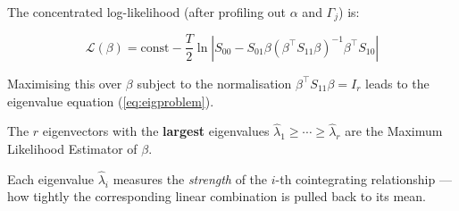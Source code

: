\documentclass[12pt, a4paper]{article}
\begin{document}
The concentrated log-likelihood (after profiling out $\alpha$ and $\Gamma_j$) is:

\begin{equation}
    \mathcal{L}(\beta) = \text{const} - \frac{T}{2} \ln\left| S_{00} - S_{01}\beta(\beta^\top S_{11} \beta)^{-1}\beta^\top S_{10} \right|
\end{equation}

Maximising this over $\beta$ subject to the normalisation $\beta^\top S_{11} \beta = I_r$ leads to 
the eigenvalue equation (\ref{eq:eigproblem}).

The $r$ eigenvectors with the \textbf{largest} eigenvalues $\hat{\lambda}_1 \geq \cdots \geq \hat{\lambda}_r$ 
are the Maximum Likelihood Estimator of $\beta$.

Each eigenvalue $\hat{\lambda}_i$ measures the \emph{strength} of the $i$-th cointegrating 
relationship — how tightly the corresponding linear combination is pulled back to its mean.
\end{document}
